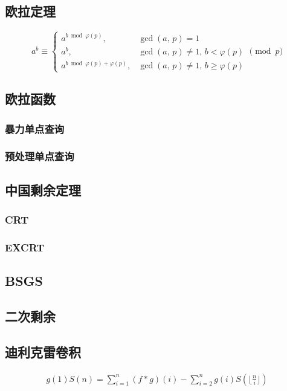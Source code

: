 \documentclass{article}
\begin{document}
\subsection{欧拉定理}

$$
a^b\equiv
\begin{cases}
a^{b\bmod\varphi(p)},\,&\gcd(a,\,p)=1\\
a^b,&\gcd(a,\,p)\ne1,\,b<\varphi(p)\\
a^{b\bmod\varphi(p)+\varphi(p)},&\gcd(a,\,p)\ne1,\,b\ge\varphi(p)
\end{cases}
\pmod p
$$

\subsection{欧拉函数}
\subsubsection{暴力单点查询}

\subsubsection{预处理单点查询}

\subsection{中国剩余定理}
\subsubsection{CRT}

\subsubsection{EXCRT}

\subsection{BSGS}

\subsection{二次剩余}

\subsection{迪利克雷卷积}

$$
\begin{aligned}
g(1)S(n)=\sum_{i=1}^n(f*g)(i)-\sum_{i=2}^ng(i)S(\lfloor\frac{n}{i}\rfloor)
\end{aligned}
$$
\end{document}
